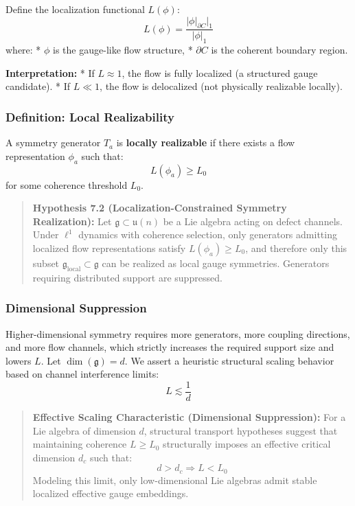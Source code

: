 \documentclass[
]{article}
\begin{document}
Define the localization functional \(L(\phi)\):
\[ L(\phi) = \frac{|\phi|_{\partial C}|_1}{|\phi|_1} \] where: *
\(\phi\) is the gauge-like flow structure, * \(\partial C\) is the
coherent boundary region.

\textbf{Interpretation:} * If \(L \approx 1\), the flow is fully
localized (a structured gauge candidate). * If \(L \ll 1\), the flow is
delocalized (not physically realizable locally).

\subsubsection{Definition: Local
Realizability}\label{definition-local-realizability-1}

A symmetry generator \(T_a\) is \textbf{locally realizable} if there
exists a flow representation \(\phi_a\) such that:
\[ L(\phi_a) \geq L_0 \] for some coherence threshold \(L_0\).

\begin{quote}
\textbf{Hypothesis 7.2 (Localization-Constrained Symmetry Realization):}
Let \(\mathfrak{g} \subset \mathfrak{u}(n)\) be a Lie algebra acting on
defect channels. Under \(\ell^1\) dynamics with coherence selection,
only generators admitting localized flow representations satisfy
\(L(\phi_a) \geq L_0\), and therefore only this subset
\(\mathfrak{g}_{\text{local}} \subset \mathfrak{g}\) can be realized as
local gauge symmetries. Generators requiring distributed support are
suppressed.
\end{quote}

\subsubsection{Dimensional Suppression}\label{dimensional-suppression-1}

Higher-dimensional symmetry requires more generators, more coupling
directions, and more flow channels, which strictly increases the
required support size and lowers \(L\). Let \(\dim(\mathfrak{g}) = d\).
We assert a heuristic structural scaling behavior based on channel
interference limits: \[ L \lesssim \frac{1}{d} \]

\begin{quote}
\textbf{Effective Scaling Characteristic (Dimensional Suppression):} For
a Lie algebra of dimension \(d\), structural transport hypotheses
suggest that maintaining coherence \(L \ge L_0\) structurally imposes an
effective critical dimension \(d_c\) such that:
\[ d > d_c \Rightarrow L < L_0 \] Modeling this limit, only
low-dimensional Lie algebras admit stable localized effective gauge
embeddings.
\end{quote}
\end{document}
